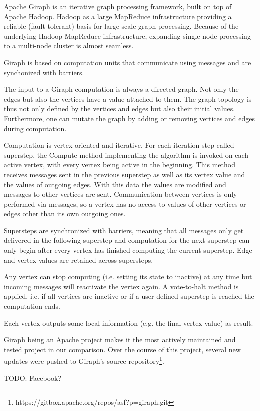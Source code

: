 

Apache Giraph is an iterative graph processing framework, built on top of Apache Hadoop\cite{Giraph}. Hadoop as a large MapReduce infrastructure providing a reliable (fault tolerant) basis for large scale graph processing.
Because of the underlying Hadoop MapReduce infrastructure, expanding single-node processing to a multi-node cluster is almost seamless.

Giraph is based on computation units that communicate using messages and are synchonized with barriers.

The input to a Giraph computation is always a directed graph. Not only the edges but also the vertices have a value attached to them. The graph topology is thus not only defined by the vertices and edges but also their initial values.
Furthermore, one can mutate the graph by adding or removing vertices and edges during computation.

Computation is vertex oriented and iterative.
For each iteration step called superstep, the Compute method implementing the algorithm is invoked on each active vertex, with every vertex being active in the beginning.
This method receives messages sent in the previous superstep as well as its vertex value and the values of outgoing edges.
With this data the values are modified and messages to other vertices are sent.
Communication between vertices is only performed via messages, so a vertex has no access to values of other vertices or edges other than its own outgoing ones.

Supersteps are synchronized with barriers, meaning that all messages only get delivered in the following superstep and computation for the next superstep can only begin after every vertex has finished computing the current superstep.
Edge and vertex values are retained across supersteps.

Any vertex can stop computing (i.e. setting its state to inactive) at any time but incoming messages will reactivate the vertex again.
A vote-to-halt method is applied, i.e. if all vertices are inactive or if a user defined superstep is reached the computation ends.

Each vertex outputs some local information (e.g. the final vertex value) as result.

Giraph being an Apache project makes it the most actively maintained and tested project in our comparison. Over the course of this project, several new updates were pushed to Giraph's source repository\footnote{https://gitbox.apache.org/repos/asf?p=giraph.git}.

TODO: Facebook?
